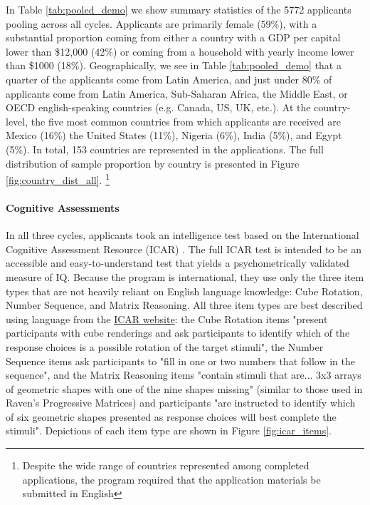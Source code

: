 In Table \ref{tab:pooled_demo} we show summary statistics of the 5772 applicants pooling across all cycles. Applicants are primarily female (59\%), with a substantial proportion coming from either a country with a GDP per capital lower than \$12,000 (42\%) or coming from a household with yearly income lower than \$1000 (18\%). Geographically, we see in Table \ref{tab:pooled_demo} that a quarter of the applicants come from Latin America, and just under 80\% of applicants come from Latin America, Sub-Saharan Africa, the Middle East, or OECD english-speaking countries (e.g. Canada, US, UK, etc.). At the country-level, the five most common countries from which applicants are received are Mexico (16\%) the United States (11\%), Nigeria (6\%), India (5\%), and Egypt (5\%). In total, 153 countries are represented in the applications. The full distribution of sample proportion by country is presented in Figure \ref{fig:country_dist_all}. \footnote{Despite the wide range of countries represented among completed applications, the program required that the application materials be submitted in English}

\paragraph{Cognitive Assessments} In all three cycles, applicants took an intelligence test based on the International Cognitive Assessment Resource (ICAR) \cite{condon2014international, subotic2020psychometric}. The full ICAR test is intended to be an accessible and easy-to-understand test that yields a psychometrically validated measure of IQ. Because the program is international, they use only the three item types that are not heavily reliant on English language knowledge: Cube Rotation, Number Sequence, and Matrix Reasoning. All three item types are best described using language from the \hyperlink{https://icar-project.org/types/index.html}{ICAR website}: the Cube Rotation items "present participants with cube renderings and ask participants to identify which of the response choices is a possible rotation of the target stimuli", the Number Sequence items ask participants to "fill in one or two numbers that follow in the sequence", and the Matrix Reasoning items "contain stimuli that are... 3x3 arrays of geometric shapes with one of the nine shapes missing" (similar to those used in Raven's Progressive Matrices) and participants "are instructed to identify which of six geometric shapes presented as response choices will best complete the stimuli". Depictions of each item type are shown in Figure \ref{fig:icar_items}. 

